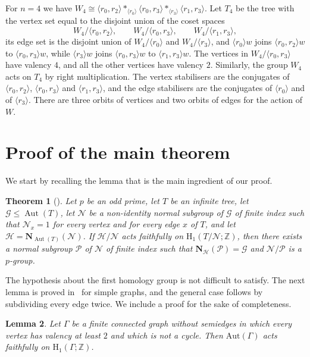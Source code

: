 \documentclass{amsart}
\theoremstyle{plain}
\newtheorem{theorem}{Theorem}[section]
\newtheorem{lemma}[theorem]{Lemma}
\theoremstyle{definition}
\theoremstyle{remark}
\newcommand{\ZZ}{\mathbb{Z}}
\renewcommand{\P}{\mathcal P}
\newcommand{\N}{\mathcal N}
\renewcommand{\H}{\mathcal H}
\newcommand{\G}{\mathcal G}
\newcommand{\No}{\mathbf N}
\newcommand{\Aut}{\mathrm{Aut}}
\begin{document}
For $n=4$ we have $W_4\cong\langle r_0,r_2\rangle *_{\langle r_0\rangle} \langle r_0,r_3\rangle
*_{\langle r_3\rangle} \langle r_1,r_3\rangle$. Let $T_4$ be the tree with the vertex set equal to the
disjoint union of the coset spaces
\[
	W_4/\langle r_0,r_2\rangle, \qquad W_4/\langle r_0, r_3\rangle, \qquad W_4/\langle r_1,r_3\rangle,
\]
its edge set is the disjoint union of $W_4/\langle r_0\rangle$ and
$W_4/\langle r_3\rangle$, and $\langle r_0\rangle w$ joins
$\langle r_0,r_2\rangle w$ to $\langle r_0, r_3\rangle w$, while $\langle r_3\rangle w$ joins
$\langle r_0, r_3\rangle w$ to $\langle r_1, r_3\rangle w$.
The vertices in $W_4/\langle r_0,r_3\rangle$ have valency $4$, and all the other vertices
have valency $2$. Similarly, the group $W_4$ acts on $T_4$ by right multiplication. The vertex stabilisers are the
conjugates of $\langle r_0,r_2 \rangle$,
$\langle r_0,r_3\rangle$ and $\langle r_1,r_3\rangle$, and the edge stabilisers are the
conjugates of $\langle r_0\rangle$ and of $\langle r_3\rangle$. There are three orbits of
vertices and two orbits of edges for the action of $W$.

\section{Proof of the main theorem}
We start by recalling the lemma that is the main ingredient of our proof.

\begin{theorem}[{\cite[Theorem 5]{PotocnikSpiga2019}}]
\label{thm:lifting5}
Let $p$ be an odd prime, let ${T}$ be an infinite tree, let
$\G\le\operatorname{Aut}({T})$, let $\N$ be a
non-identity normal subgroup of $\G$ of finite index such that
$\N_x=1$ for every vertex and for every edge $x$ of ${T}$,
and let $\H=\No_{\operatorname{Aut}({T})}(\N)$.
If $\H/\N$ acts faithfully on
$\mathrm{H}_1({T}/\N;\mathbb{Z})$, then there exists a normal
subgroup $\P$ of $\N$ of finite index such that
$\No_{\H}(\P)=\G$ and $\N/\P$
is a $p$-group.
\end{theorem}

The hypothesis about the first homology group is not difficult to satisfy. The next
lemma is proved in~\cite[Proposition 5]{EstelyiKarabasMednykhNedela2021} for simple
graphs, and the general case follows by subdividing every edge twice. We include a
proof for the sake of completeness.

\begin{lemma}\label{rem:H1}
	Let $\Gamma$ be a finite connected graph without semiedges in which every vertex has
	valency at least $2$ and which is not a cycle. Then $\Aut(\Gamma)$ acts faithfully on
	$\mathrm{H}_1(\Gamma;\ZZ)$.
\end{lemma}
\end{document}
